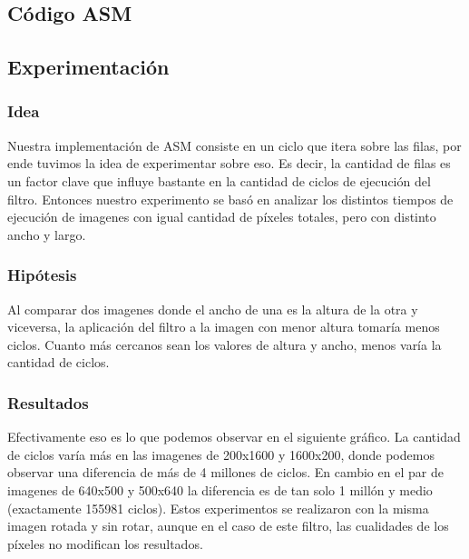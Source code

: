 \subsection{Código ASM}
	
	
	
\subsection{Experimentación}

\subsubsection{Idea}
Nuestra implementación de ASM consiste en un ciclo que itera sobre las filas, por ende tuvimos la idea de experimentar sobre eso. Es decir, la cantidad de filas es un factor clave que influye bastante en la cantidad de ciclos de ejecución del filtro. Entonces nuestro experimento se basó en analizar los distintos tiempos de ejecución de imagenes con igual cantidad de píxeles totales, pero con distinto ancho y largo.
\subsubsection{Hipótesis}
	Al comparar dos imagenes donde el ancho de una es la altura de la otra y viceversa, la aplicación del filtro a la imagen con menor altura tomaría menos ciclos. Cuanto más cercanos sean los valores de altura y ancho, menos varía la cantidad de ciclos.
	
\subsubsection{Resultados}
	Efectivamente eso es lo que podemos observar en el siguiente gráfico. La cantidad de ciclos varía más en las imagenes de 200x1600 y 1600x200, donde podemos observar una diferencia de más de 4 millones de ciclos. En cambio en el par de imagenes de 640x500 y 500x640 la diferencia es de tan solo 1 millón y medio (exactamente 155981 ciclos). Estos experimentos se realizaron con la misma imagen rotada y sin rotar, aunque en el caso de este filtro, las cualidades de los píxeles no modifican los resultados.

